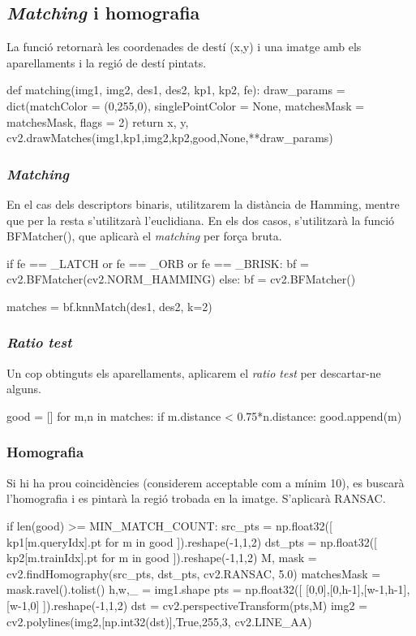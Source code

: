 \newpage
	\subsection{\textit{Matching} i homografia}
La funció retornarà les coordenades de destí (x,y) i una imatge amb els aparellaments i la regió de destí pintats.\\
		\begin{python}
def matching(img1, img2, des1, des2, kp1, kp2, fe):
	draw_params = dict(matchColor = (0,255,0), singlePointColor = None,
					matchesMask = matchesMask, flags = 2)
	return x, y, cv2.drawMatches(img1,kp1,img2,kp2,good,None,**draw_params)
		\end{python}

		\subsubsection{\textit{Matching}}
		En el cas dels descriptors binaris, utilitzarem la distància de Hamming, mentre que per la resta s'utilitzarà l'euclidiana. En els dos casos, s'utilitzarà la funció BFMatcher(), que aplicarà el
		\textit{matching} per força bruta.\\
		\begin{python}
	if fe == _LATCH or fe == _ORB or fe == _BRISK:
		bf = cv2.BFMatcher(cv2.NORM_HAMMING)
	else:
		bf = cv2.BFMatcher()

	matches = bf.knnMatch(des1, des2, k=2)
		\end{python}

		\subsubsection{\textit{Ratio test}}
Un cop obtinguts els aparellaments, aplicarem el \textit{ratio test} per descartar-ne alguns.\\
		\begin{python}
	good = []
	for m,n in matches:
		if m.distance < 0.75*n.distance:
			good.append(m)
		\end{python}

\newpage
		\subsubsection{Homografia}
Si hi ha prou coincidències (considerem acceptable com a mínim 10), es buscarà l'homografia i es pintarà la regió trobada en la imatge. S'aplicarà RANSAC. \\
		\begin{python}
	if len(good) >= MIN_MATCH_COUNT:
		src_pts = np.float32([ kp1[m.queryIdx].pt for m in good ]).reshape(-1,1,2)
		dst_pts = np.float32([ kp2[m.trainIdx].pt for m in good ]).reshape(-1,1,2)
		M, mask = cv2.findHomography(src_pts, dst_pts, cv2.RANSAC, 5.0)
		matchesMask = mask.ravel().tolist()
		h,w,_ = img1.shape
		pts = np.float32([ [0,0],[0,h-1],[w-1,h-1],[w-1,0] ]).reshape(-1,1,2)
		dst = cv2.perspectiveTransform(pts,M)
		img2 = cv2.polylines(img2,[np.int32(dst)],True,255,3, cv2.LINE_AA)
		\end{python}

